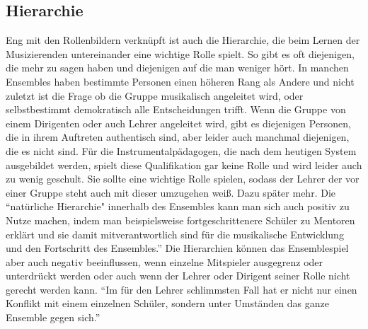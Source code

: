 \subsection{Hierarchie}
Eng mit den Rollenbildern verknüpft ist auch die Hierarchie, die beim Lernen der
Musizierenden untereinander eine wichtige Rolle spielt. So gibt es oft
diejenigen, die mehr zu sagen haben und diejenigen auf die man weniger hört. In
manchen Ensembles haben bestimmte Personen einen höheren Rang als Andere und
nicht zuletzt ist die Frage ob die Gruppe musikalisch angeleitet wird, oder
selbstbestimmt demokratisch alle Entscheidungen trifft. Wenn die Gruppe von
einem Dirigenten oder auch Lehrer angeleitet wird, gibt es diejenigen Personen,
die in ihrem Auftreten authentisch sind, aber leider auch manchmal diejenigen,
die es nicht sind. Für die Instrumentalpädagogen, die nach dem heutigen System
ausgebildet werden, spielt diese Qualifikation gar keine Rolle und wird leider
auch zu wenig geschult. Sie sollte eine wichtige Rolle spielen, sodass der
Lehrer der vor einer Gruppe steht auch mit dieser umzugehen weiß. Dazu später
mehr. Die \enquote{natürliche Hierarchie" innerhalb des Ensembles kann man sich auch
positiv zu Nutze machen, indem man beispielsweise fortgeschrittenere Schüler zu
Mentoren erklärt und sie damit mitverantwortlich sind für die musikalische
Entwicklung und den Fortschritt des
Ensembles.}\autocite[95]{doerne:umfassend_musizieren} Die Hierarchien können das
Ensemblespiel aber auch negativ beeinflussen, wenn einzelne Mitspieler
ausgegrenz oder unterdrückt werden oder auch wenn der Lehrer oder Dirigent
seiner Rolle nicht gerecht werden kann. \enquote{Im für den Lehrer schlimmsten Fall hat
er nicht nur einen Konflikt mit einem einzelnen Schüler, sondern unter Umständen
das ganze Ensemble gegen sich.}\autocite[94]{mitzscherlich:musikpsychologie}


